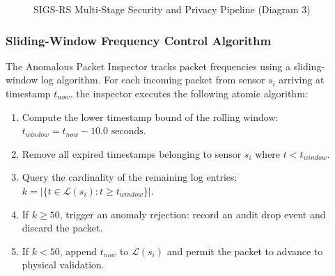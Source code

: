 \documentclass[a4paper]{article}
\begin{document}
\begin{figure}[H]
\caption{SIGS-RS Multi-Stage Security and Privacy Pipeline (Diagram 3)}
\label{fig:security_pipeline}
\end{figure}

\subsubsection{Sliding-Window Frequency Control Algorithm}
The Anomalous Packet Inspector tracks packet frequencies using a sliding-window log algorithm. For each incoming packet from sensor $s_i$ arriving at timestamp $t_{now}$, the inspector executes the following atomic algorithm:
\begin{enumerate}
    \item Compute the lower timestamp bound of the rolling window: $t_{window} = t_{now} - 10.0\text{ seconds}$.
    \item Remove all expired timestamps belonging to sensor $s_i$ where $t < t_{window}$.
    \item Query the cardinality of the remaining log entries: $k = |\{t \in \mathcal{L}(s_i) : t \ge t_{window}\}|$.
    \item If $k \ge 50$, trigger an anomaly rejection: record an audit drop event and discard the packet.
    \item If $k < 50$, append $t_{now}$ to $\mathcal{L}(s_i)$ and permit the packet to advance to physical validation.
\end{enumerate}
\end{document}
